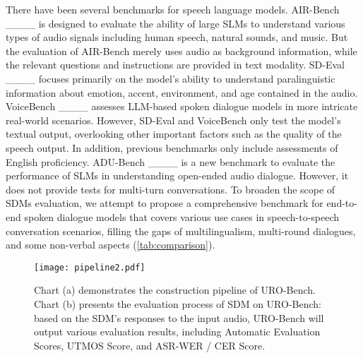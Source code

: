 There have been several benchmarks for speech language models. AIR-Bench ____ is designed to evaluate the ability of large SLMs to understand various types of audio signals including human speech, natural sounds, and music. But the evaluation of AIR-Bench merely uses audio as background information, while the relevant questions and instructions are provided in text modality. SD-Eval ____ focuses primarily on the model's ability to understand paralinguistic information about emotion, accent, environment, and age contained in the audio. VoiceBench ____ assesses LLM-based spoken dialogue models in more intricate real-world scenarios. However, SD-Eval and VoiceBench only test the model's textual output, overlooking other important factors such as the quality of the speech output. In addition, previous benchmarks only include assessments of English proficiency. ADU-Bench ____ is a new benchmark to evaluate the performance of SLMs in understanding open-ended audio dialogue. However, it does not provide tests for multi-turn conversations. To broaden the scope of SDMs evaluation, we attempt to propose a comprehensive benchmark for end-to-end spoken dialogue models that covers various use cases in speech-to-speech conversation scenarios, filling the gaps of multilingualism, multi-round dialogues, and some non-verbal aspects (\autoref{tab:comparison}).


\begin{figure*}[t]
\centering
\texttt{[image: pipeline2.pdf]}
\caption{Chart (a) demonstrates the construction pipeline of URO-Bench. Chart (b) presents the evaluation process of SDM on URO-Bench: based on the SDM's responses to the input audio, URO-Bench will output various evaluation results, including Automatic Evaluation Scores, UTMOS Score, and ASR-WER / CER Score.}
\label{fig:pipeline}
\end{figure*}